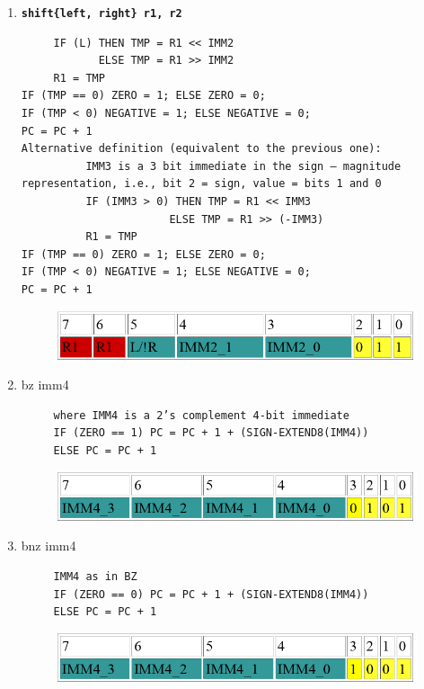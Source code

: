 \documentclass[../notes.tex]{subfiles}
\begin{document}
\begin{enumerate}
	\item \textbf{\texttt{shift\{left, right\} r1, r2}}
		\begin{listing}[H]
		\begin{verbatim}
     IF (L) THEN TMP = R1 << IMM2
            ELSE TMP = R1 >> IMM2
     R1 = TMP
IF (TMP == 0) ZERO = 1; ELSE ZERO = 0;
IF (TMP < 0) NEGATIVE = 1; ELSE NEGATIVE = 0;
PC = PC + 1
Alternative definition (equivalent to the previous one):
          IMM3 is a 3 bit immediate in the sign – magnitude representation, i.e., bit 2 = sign, value = bits 1 and 0
          IF (IMM3 > 0) THEN TMP = R1 << IMM3
                       ELSE TMP = R1 >> (-IMM3)
          R1 = TMP
IF (TMP == 0) ZERO = 1; ELSE ZERO = 0;
IF (TMP < 0) NEGATIVE = 1; ELSE NEGATIVE = 0;
PC = PC + 1
		\end{verbatim}
		\end{listing}

		\begin{figure}[H]
			\centering
			\includegraphics[width=0.8\linewidth]{img/image_2022-11-03-14-59-19.png}
		\end{figure}

	\item bz imm4
		\begin{listing}[H]
		\begin{verbatim}
     where IMM4 is a 2’s complement 4-bit immediate
     IF (ZERO == 1) PC = PC + 1 + (SIGN-EXTEND8(IMM4))
     ELSE PC = PC + 1
		\end{verbatim}
		\end{listing}
		\begin{figure}[H]
			\centering
			\includegraphics[width=0.8\linewidth]{img/image_2022-11-03-14-59-29.png}
		\end{figure}


	\item bnz imm4
		\begin{listing}[H]
		\begin{verbatim}
     IMM4 as in BZ
     IF (ZERO == 0) PC = PC + 1 + (SIGN-EXTEND8(IMM4))
     ELSE PC = PC + 1
		\end{verbatim}
		\end{listing}
		\begin{figure}[H]
			\centering
			\includegraphics[width=0.8\linewidth]{img/image_2022-11-03-14-59-39.png}
		\end{figure}



\end{enumerate}
\end{document}
